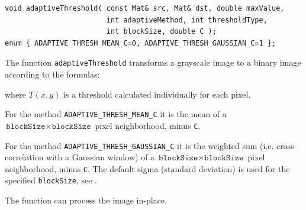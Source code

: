 \begin{lstlisting}
void adaptiveThreshold( const Mat& src, Mat& dst, double maxValue,
                        int adaptiveMethod, int thresholdType,
                        int blockSize, double C );
enum { ADAPTIVE_THRESH_MEAN_C=0, ADAPTIVE_THRESH_GAUSSIAN_C=1 };
\end{lstlisting}
\begin{description}
\end{description}

The function \texttt{adaptiveThreshold} transforms a grayscale image to a binary image according to the formulas:

\begin{description}
\end{description}

where $T(x,y)$ is a threshold calculated individually for each pixel.

For the method \texttt{ADAPTIVE\_THRESH\_MEAN\_C} it is the mean of a $\texttt{blockSize} \times \texttt{blockSize}$ pixel neighborhood, minus \texttt{C}.

For the method \texttt{ADAPTIVE\_THRESH\_GAUSSIAN\_C} it is the weighted sum (i.e. cross-correlation with a Gaussian window) of a $\texttt{blockSize} \times \texttt{blockSize}$ pixel neighborhood, minus \texttt{C}. The default sigma (standard deviation) is used for the specified \texttt{blockSize}, see .

The function can process the image in-place.

